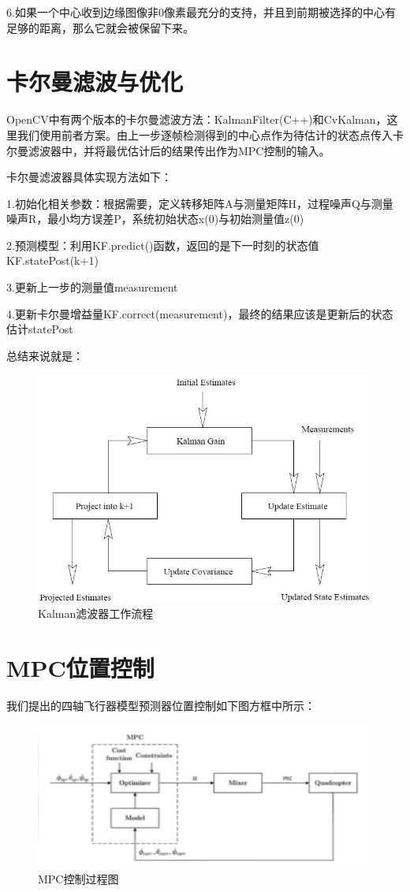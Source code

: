 6.如果⼀个中心收到边缘图像⾮0像素最充分的支持，并且到前期被选择的中心有足够的距离，那么它就会被保留下来。

\section{卡尔曼滤波与优化}

OpenCV中有两个版本的卡尔曼滤波方法：KalmanFilter(C++)和CvKalman，这里我们使用前者方案。由上一步逐帧检测得到的中心点作为待估计的状态点传入卡尔曼滤波器中，并将最优估计后的结果传出作为MPC控制的输入。

卡尔曼滤波器具体实现方法如下：

1.初始化相关参数：根据需要，定义转移矩阵A与测量矩阵H，过程噪声Q与测量噪声R，最小均方误差P，系统初始状态x(0)与初始测量值z(0)

2.预测模型：利用KF.predict()函数，返回的是下一时刻的状态值KF.statePost(k+1)

3.更新上一步的测量值measurement

4.更新卡尔曼增益量KF.correct(measurement)，最终的结果应该是更新后的状态估计statePost

总结来说就是：

\begin{figure}[ht]
  \centering
  \includegraphics[width=0.8\linewidth]{./Figure/Kalman_Filter_Code_Process.jpeg}
  \caption{Kalman滤波器工作流程}\label{Fig:xd1}
\end{figure}

\section{MPC位置控制}

我们提出的四轴飞行器模型预测器位置控制如下图方框中所示：

\begin{figure}[ht]
  \centering
  \includegraphics[width=0.8\linewidth]{./Figure/MPC-Diagram.png}
  \caption{MPC控制过程图}\label{Fig:xd1}
\end{figure}

